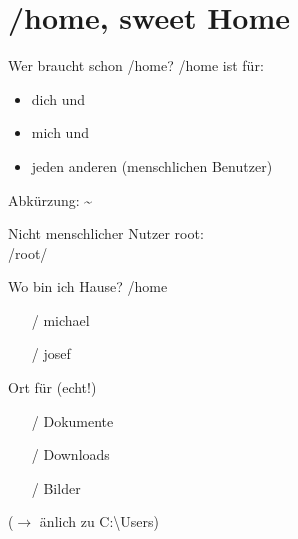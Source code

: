 \section[/home]{/home, sweet Home}
\begin{frame}{Wer braucht schon /home?}
/home ist für:
\begin{itemize}
 \item dich und
 \item mich und
 \item jeden anderen (menschlichen Benutzer)
\end{itemize}
Abkürzung: \textasciitilde

\vfill

Nicht menschlicher Nutzer root:\\
/root/
\vfill



\end{frame}

\begin{frame}{Wo bin ich Hause?}
/home
\begin{itemize}
  \item [/] michael
  \item [/] josef
\end{itemize}
\vfill
Ort für  {\small (echt!)}
\begin{itemize}
 \item [/] Dokumente
 \item [/] Downloads
 \item [/] Bilder
\end{itemize}
\vfill
($\longrightarrow$ änlich zu C:\textbackslash Users)

\vfill
\end{frame}